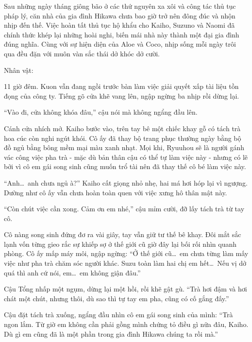 \documentclass[../main.tex]{subfiles}
\begin{document}
Sau những ngày tháng giông bão ở các thứ nguyên xa xôi và công tác thủ tục pháp lý, căn nhà của gia đình Hikawa chưa bao giờ trở nên đông đúc và nhộn nhịp đến thế. Việc hoàn tất thủ tục hộ khẩu cho Kaiho, Suzuno và Naomi đã chính thức khép lại những hoài nghi, biến mái nhà này thành một đại gia đình đúng nghĩa. Cùng với sự hiện diện của Aloe và Coco, nhịp sống mỗi ngày trôi qua đều đặn với muôn vàn sắc thái dở khóc dở cười.

\begin{center}
{\caviar\fontsize{12pt}{12pt}\selectfont Nhân vật:  }
\end{center}


11 giờ đêm. Kuon vẫn đang ngồi trước bàn làm việc giải quyết xấp tài liệu tồn đọng của công ty. Tiếng gõ cửa khẽ vang lên, ngập ngừng ba nhịp rồi dừng lại.

``Vào đi, cửa không khóa đâu,'' cậu nói mà không ngẩng đầu lên.

Cánh cửa nhích mở. Kaiho bước vào, trên tay bê một chiếc khay gỗ có tách trà hoa cúc còn nghi ngút khói. Cô ấy đã thay bộ trang phục thường ngày bằng bộ đồ ngủ bằng bông mềm mại màu xanh nhạt. Mọi khi, Ryuuhou sẽ là người gánh vác công việc pha trà - mặc dù bản thân cậu có thể tự làm việc này - nhưng có lẽ bởi vì cô em gái song sinh cũng muốn trổ tài nên đã thay thế cô bé làm việc này.

``Anh\dots\ anh chưa ngủ à?'' Kaiho cất giọng nhỏ nhẹ, hai má hơi hóp lại vì ngượng. Dường như cô ấy vẫn chưa hoàn toàn quen với việc xưng hô thân mật này.

``Còn chút việc cần xong. Cảm ơn em nhé,'' cậu mỉm cười, đỡ lấy tách trà từ tay cô.

Cô nàng song sinh đứng đơ ra vài giây, tay vẫn giữ tư thế bê khay. Đôi mắt sắc lạnh vốn từng gieo rắc sự khiếp sợ ở thế giới cũ giờ đây lại bối rối nhìn quanh phòng. Cô ấy mấp máy môi, ngập ngừng: ``Ở thế giới cũ\dots\ em chưa từng làm mấy việc như pha trà chăm sóc người khác. Suzu toàn làm hai chị em hết\dots\ Nếu vị dở quá thì anh cứ nói, em\dots\ em không giận đâu.''

Cậu Tổng nhấp một ngụm, dừng lại một hồi, rồi khẽ gật gù. ``Trà hơi đậm và hơi chát một chút, nhưng thôi, dù sao thì tự tay em pha, cũng có cố gắng đấy.''

Cậu đặt tách trà xuống, ngẩng đầu nhìn cô em gái song sinh của mình: ``Trà ngon lắm. Từ giờ em không cần phải gồng mình chứng tỏ điều gì nữa đâu, Kaiho. Dù gì em cũng đã là một phần trong gia đình Hikawa chúng ta rồi mà.''
\end{document}
